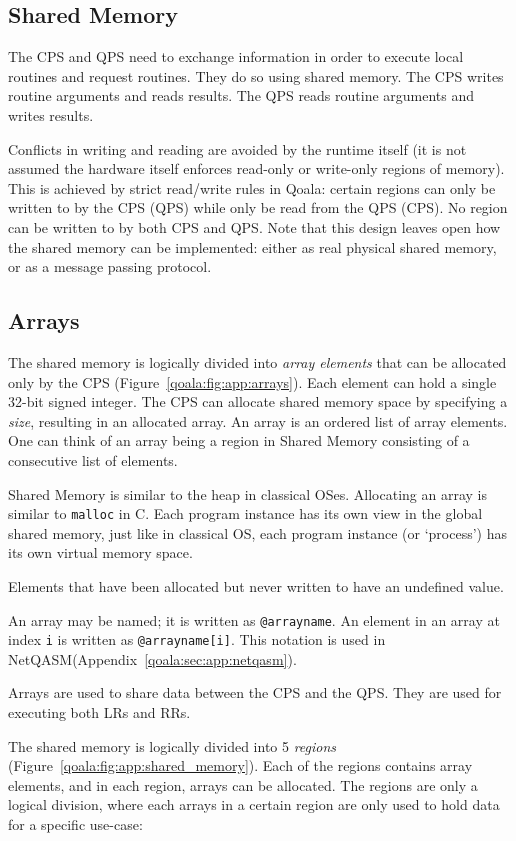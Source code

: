 \subsection{Shared Memory}
\label{qoala:sec:app:shared_memory}
The CPS and QPS need to exchange information in order to execute local routines and request routines. They do so using shared memory.
The CPS writes routine arguments and reads results.
The QPS reads routine arguments and writes results.

Conflicts in writing and reading are avoided by the runtime itself (it is not assumed the hardware itself enforces read-only or write-only regions of memory).
This is achieved by strict read/write rules in Qoala: certain regions can only be written to by the CPS (QPS) while only be read from the QPS (CPS).
No region can be written to by both CPS and QPS.
Note that this design leaves open how the shared memory can be implemented: either as real physical shared memory, or as a message passing protocol.


\subsection{Arrays}
The shared memory is logically divided into \textit{array elements} that can be allocated only by the CPS (Figure~\ref{qoala:fig:app:arrays}).
Each element can hold a single 32-bit signed integer.
The CPS can allocate shared memory space by specifying a \textit{size}, resulting in an allocated array.
An array is an ordered list of array elements. 
One can think of an array being a region in Shared Memory consisting of a consecutive list of elements.

Shared Memory is similar to the heap in classical OSes. Allocating an array is similar to \texttt{malloc} in C. Each program instance has its own view in the global shared memory, just like in classical OS, each program instance (or `process') has its own virtual memory space.

Elements that have been allocated but never written to have an undefined value.

An array may be named; it is written as \texttt{@arrayname}. An element in an array at index \texttt{i} is written as \texttt{@arrayname[i]}. This notation is used in NetQASM(Appendix~\ref{qoala:sec:app:netqasm}).

Arrays are used to share data between the CPS and the QPS.
They are used for executing both LRs and RRs.

The shared memory is logically divided into 5 \textit{regions} (Figure~\ref{qoala:fig:app:shared_memory}).
Each of the regions contains array elements, and in each region, arrays can be allocated.
The regions are only a logical division, where each arrays in a certain region are only used to hold data for a specific use-case:

